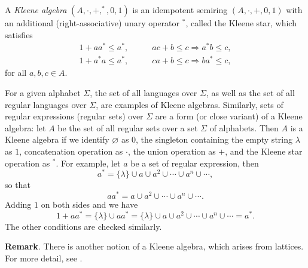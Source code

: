 \documentclass[12pt]{article}
\begin{document}
A \emph{Kleene algebra} $(A, \cdot, +, ^*, 0, 1)$ is an idempotent semiring
$(A, \cdot, +, 0, 1)$ with an additional (right-associative) unary operator $^*$, called the Kleene star, which satisfies
$$
\begin{array}{rl}
1+aa^*\leq a^*, & \qquad ac+b\leq c\Rightarrow a^*b\leq c, \\
1+a^*a\leq a^*, & \qquad ca+b\leq c\Rightarrow ba^*\leq c,
\end{array}
$$
for all $a, b, c\in A$.

For a given alphabet $\Sigma$, the set of all languages over $\Sigma$, as well as the set of all regular languages over $\Sigma$, are examples of Kleene algebras.  Similarly, sets of regular expressions (regular sets) over $\Sigma$ are a form (or close variant) of a Kleene algebra: let $A$ be the set of all regular sets over a set $\Sigma$ of alphabets.  Then $A$ is a Kleene algebra if we identify $\varnothing$ as $0$, the singleton containing the empty string $\lambda$ as $1$, concatenation operation as $\cdot$, the union operation as $+$, and the Kleene star operation as $^*$.  For example, let $a$ be a set of regular expression, then $$a^*=\lbrace \lambda \rbrace \cup a \cup a^2 \cup \cdots \cup a^n \cup \cdots,$$ so that $$aa^*=a \cup a^2 \cup \cdots \cup a^n \cup \cdots.$$ Adding $1$ on both sides and we have $$1+aa^*=\lbrace \lambda \rbrace \cup aa^*=\lbrace \lambda \rbrace \cup a \cup a^2 \cup \cdots \cup a^n \cup \cdots = a^*.$$  The other conditions are checked similarly.

\textbf{Remark}.  There is another notion of a Kleene algebra, which arises from lattices.  For more detail, see .
\end{document}
